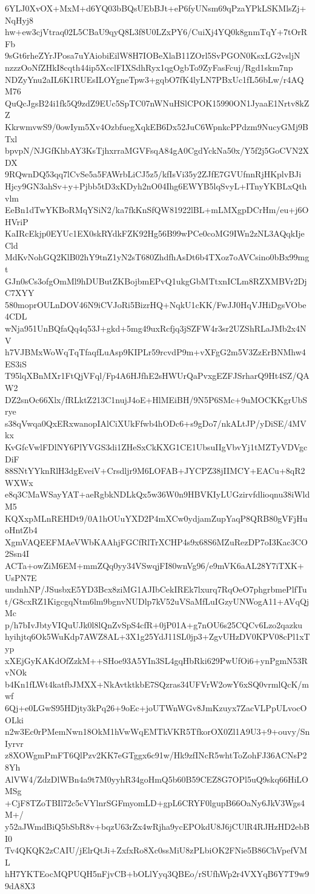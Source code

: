 6YLJ0XvOX+MxM+d6YQ03bBQsUEbBJt+eP6fyUNsm69qPzaYPkLSKMlsZj+NqHyj8
hw+ew3cjVtraq02L5CBaU9qyQ8L3f8U0LZxPY6/CuiXj4YQ0k8gnmTqY+7tOrRFb
9sGt6rheZYrJPosa7uYAiobiEilW8H7IOBeXlaB11ZOrl5SvPGON0KsxLG2vsljN
nzzzOoNfZHkI8cqth44ip5XcclFIXSdhRyx1qgOgbTo9ZyFasFcuj/Rgd1skm7np
NDZyYnu2aIL6K1RUEsILOYgneTpw3+gqbO7fK4lyLN7PBxUc1fL56bLw/r4AQM76
QuQcJgsB24i1fk5Q9zdZ9EUc5SpTC07nWNuHSlCPOK15990ON1JyaaE1Nrtv8kZZ
KkrwmvwS9/0owIym5Xv4OzbfuegXqkEB6Dx52JuC6WpnkcPPdzm9NucyGMj9BTxl
bpvpN/NJGfKhbAY3KsTjhxrraMGVFsqA84gA0CgdYckNa50x/Y5f2j5GoCVN2XDX
9RQwnDQ53qq7lCvSe5a5FAWrbLiCJ5z5/kfIsVi35y2ZJfE7GVUfnnRjHKplvBJi
Hjcy9GN3ahSv+y+Pjbb5tD3xKDyh2nO04Ihg6EWYB5lqSvyL+ITnyYKBLxQthvlm
EeBn1dTwYKBoRMqYSiN2/ka7fkKnSfQW81922lBL+mLMXgpDCrHm/eu+j6OHVriP
KaIRcEkjp0EYUc1EX0skRYdkFZK92Hg56B99wPCe0coMG9IWn2zNL3AQqkIjeCld
MdKvNohGQ2KlB02hY9tnZ1yN2sT680ZhdfhAsDt6b4TXoz7oAVCsino0bBx99mgt
GJn0sCs3ofgOmMl9hDUButZKBojbmEPvQ1ukgGbMTtxnICLm8RZXMBVr2DjC7XYY
580moprOULnDOV46N9iCVJoRi5BizrHQ+NqkU1cKK/FwJJ0HqVJHiDgsVObe4CDL
wNja951UnBQfaQq4q53J+gkd+5mg49uxRcfjq3jSZFW4r3sr2UZShRLaJMb2x4NV
h7VJBMxWoWqTqTfaqfLuAsp9KIPLr59rcvdP9m+vXFgG2m5V3ZzErBNMhw4ES3iS
T95lqXBnMXr1FtQjVFql/Fp4A6HJfhE2sHWUrQaPvxgEZFJSrharQ9Ht4SZ/QAW2
DZ2snOc66Xlx/fRLktZ213C1nujJ4oE+HlMEiBH/9N5P6SMc+9uMOCKKgrUbSrye
s38qVwqa0QxERxwanopIAlCiXUkFfwb4hODc6+s9gDo7/nkALtJP/yDiSE/4MVkx
KvGfcVwlFDlNY6PlYVGS3di1ZHeSxCkKXG1CE1UbsuIIgVbvYj1tMZTyVDVgcDiF
88SNtYYknRlH3dgEveiV+Crsdljr9M6LOFAB+JYCPZ38jIIMCY+EACu+8qR2WXWx
e8q3CMaWSayYAT+aeRgbkNDLkQx5w36W0n9HBVKIyLUGzirvfdlioqnu38iWldM5
KQXxpMLnREHDt9/0A1hOUuYXD2P4mXCw0ydjamZupYaqP8QRB80gVFjHuoHntZb4
XgmVAQEEFMAeVWbKAAhjFGCfRlTrXCHP4s9x68S6MZuRezDP7oI3Kac3CO2Ssn4I
ACTa+owZiM6EM+mmZQq0yy34VSwqjFI80wnVg96/e9mVK6aAL28Y7iTXK+UsPN7E
undnhNP/JSusbxE5YD3Bcx8ziMG1AJIbCekIREk7lxurq7RqOeO7phgrbmePlfTu
t/G8cxRZ1KigcgqNtm6lm9bgnvNUDlp7kV52uVSaMfLuIGzyUNWogA11+AVqQjMc
p/h7bIvJbtyVIQuUJk0l8lQnZvSpS4cfR+0jP01A+g7nOU6s25CQCv6Lzo2qazku
hyihjtq6Ok5WuKdp7AWZ8AL+3X1g25YdJ11SL0jp3+ZgvUHzDV0KPV08cPl1xTyp
xXEjGyKAKdOfZzkM++SHoe93A5YIn3SL4gqHbRki629PwUfOi6+ynPgmN53RvNOk
b4Kn1fLWt4katfbJMXX+NkAvtktkbE7SQzras34UFVrW2owY6xSQ0vrmlQcK/mwf
6Qj+e0LGwS95HDjty3kPq26+9oEc+joUTWnWGv8JmKzuyx7ZacVLPpULvocOOLki
n2w3Ec0rPMemNwn18OkM1hVwWqEMTkVKR5TfkorOX0Zl1A9U3+9+ouvy/SnIyrvr
z8XOWgmPmFT6QlPzv2KK7eGTggx6c91w/Hk9zfINcR5whtToZohFJ36ACNsP28Yh
AlVW4/ZdzDlWBn4a9t7M0yyhR34goHmQ5b60B59CEZ8G7OPl5uQ9skq66HiLOMSg
+CjF8TZoTBIl72c5cVYlnrSGFmyomLD+gpL6CRYF0lgupB66OaNy6JkV3Wgs4M+/
y52aJWmdBiQ5bSbR8v+bqzU63rZx4wRjha9ycEPOkdU8J6jCUlR4RJHzHD2ebBI0
Tv4QKQK2zCAIU/jElrQtJi+ZxfxRo8Xc0ssMiU8zPLbiOK2FNie5B86ChVpefVML
hH7YKTEocMQPUQH5nFjvCB+bOLlYyq3QBEo/rSUfhWp2r4VXYqB6Y7T9w99dA8X3
